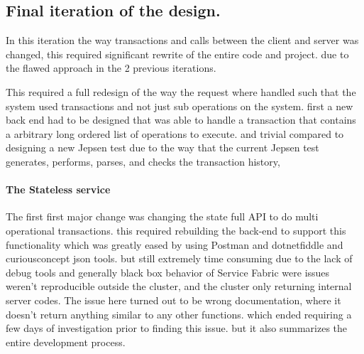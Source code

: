 \documentclass[a4paper,10pt,titlepage]{report}
\begin{document}
    

\subsection{Final iteration of the design.}
    In this iteration the way transactions and calls between the client and server was changed, this required significant rewrite of the entire code and project. due to the flawed approach in the 2 previous iterations.
    
    This required a full redesign of the way the request where handled such that the system used transactions and not just sub operations on the system. first a new back end had to be designed that was able to handle a transaction that contains a arbitrary long ordered list of operations to execute. and trivial compared to designing a new Jepsen test due to the way that the current Jepsen test generates, performs, parses, and checks the transaction history,
    

    \paragraph{The Stateless service}
    
    
    The first first major change was changing the state full API to do multi operational transactions. this required rebuilding the back-end to support this functionality which was greatly eased by using Postman and dotnetfiddle and curiousconcept json tools. but still extremely time consuming due to the lack of debug tools and generally black box behavior of Service Fabric were issues weren't reproducible outside the cluster, and the cluster only returning internal server codes. The issue here turned out to be wrong documentation, where it doesn't return anything similar to any other functions. which ended requiring a few days of investigation prior to finding this issue. but it also summarizes the entire development process.\\
    \vspace{5mm}
    
\end{document}
